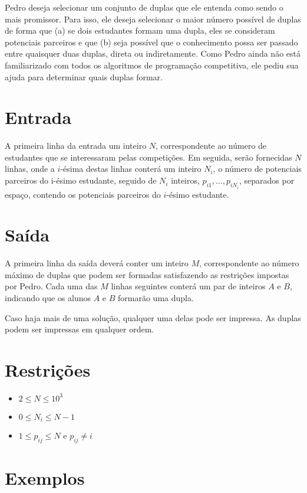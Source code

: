 Pedro deseja selecionar um conjunto de duplas que ele entenda como sendo o mais promissor. Para isso, ele deseja selecionar o maior número possível de duplas de forma que (a) se dois estudantes formam uma dupla, eles se consideram potenciais parceiros e que (b) seja possível que o conhecimento possa ser passado entre quaisquer duas duplas, direta ou indiretamente. Como Pedro ainda não está familiarizado com todos os algoritmos de programação competitiva, ele pediu sua ajuda para determinar quais duplas formar.





\section*{Entrada}

A primeira linha da entrada um inteiro $N$, correspondente ao número de estudantes que se interessaram pelas competições. Em seguida, serão fornecidas $N$ linhas, onde a $i$-ésima destas linhas conterá um inteiro $N_i$, o número de potenciais parceiros do i-ésimo estudante, seguido de $N_i$ inteiros, $p_{i1}, \ldots, p_{iN_i}$, separados por espaço, contendo os potenciais parceiros do $i$-ésimo estudante.


\section*{Saída}

A primeira linha da saída deverá conter um inteiro $M$, correspondente ao número máximo de duplas que podem ser formadas satisfazendo as restrições impostas por Pedro. Cada uma das $M$ linhas seguintes conterá um par de inteiros $A$ e $B$, indicando que os alunos $A$ e $B$ formarão uma dupla. 

Caso haja mais de uma solução, qualquer uma delas pode ser impressa. As duplas podem ser impressas em qualquer ordem. 

\section*{Restrições}

\begin{itemize}
    \item $2 \leq N \leq 10^{3}$
    \item $0 \leq N_i \leq N-1$
    \item $1 \leq p_{ij} \leq N$ e $p_{ij} \neq i$
\end{itemize}


\section*{Exemplos}

\exemplo